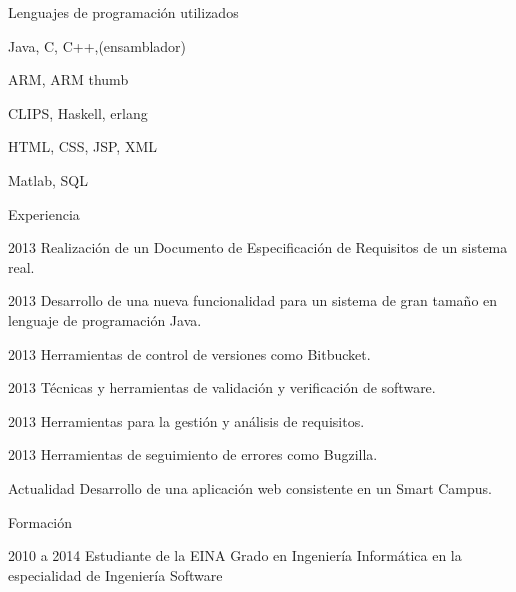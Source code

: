 \begin{cv}{}

\begin{cvlist}{Lenguajes de programación utilizados}
\item Java, C, C++,(ensamblador)
\item ARM, ARM thumb
\item CLIPS, Haskell, erlang
\item HTML, CSS, JSP, XML
\item Matlab, SQL
\end{cvlist}

\begin{cvlist}{Experiencia}

	\item[2013] Realización de un Documento de Especificación de Requisitos 
				de un sistema real.
	
	\item[2013] Desarrollo de una nueva funcionalidad para un sistema de gran 
				tama\~no en lenguaje de programación Java.
	
	\item[2013] Herramientas de control de versiones como Bitbucket.
	
	\item[2013] Técnicas y herramientas de validación y verificación de software.
	
	\item[2013] Herramientas para la gestión y análisis de requisitos.
	
	\item[2013] Herramientas de seguimiento de errores como Bugzilla.
	
	\item[Actualidad] Desarrollo de una aplicación web consistente en un Smart Campus.

\end{cvlist}

\begin{cvlist}{Formación}

	\item[2010 a 2014] Estudiante de la EINA
		Grado en Ingeniería Informática en la especialidad de Ingeniería Software


\end{cvlist}

\end{cv}
